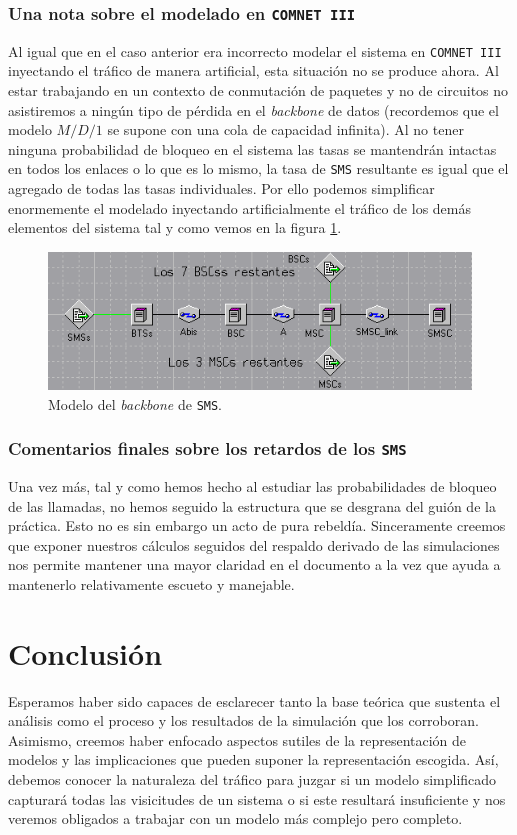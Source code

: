 \documentclass[10pt]{article}
\begin{document}
			\subsubsection{Una nota sobre el modelado en \texttt{COMNET III}}
				Al igual que en el caso anterior era incorrecto modelar el sistema en \texttt{COMNET III} inyectando el tráfico de manera artificial, esta situación no se produce ahora. Al estar trabajando en un contexto de conmutación de paquetes y no de circuitos no asistiremos a ningún tipo de pérdida en el \textit{backbone} de datos (recordemos que el modelo $M/D/1$ se supone con una cola de capacidad infinita). Al no tener ninguna probabilidad de bloqueo en el sistema las tasas se mantendrán intactas en todos los enlaces o lo que es lo mismo, la tasa de \texttt{SMS} resultante es igual que el agregado de todas las tasas individuales. Por ello podemos simplificar enormemente el modelado inyectando artificialmente el tráfico de los demás elementos del sistema tal y como vemos en la figura \ref{f:sms_system}.

				\begin{figure}
					\centering
					\includegraphics[width=0.5\linewidth]{sms_system.png}
					\caption{Modelo del \textit{backbone} de \texttt{SMS}.}
					\label{f:sms_system}
				\end{figure}

			\subsubsection{Comentarios finales sobre los retardos de los \texttt{SMS}}
				Una vez más, tal y como hemos hecho al estudiar las probabilidades de bloqueo de las llamadas, no hemos seguido la estructura que se desgrana del guión de la práctica. Esto no es sin embargo un acto de pura rebeldía. Sinceramente creemos que exponer nuestros cálculos seguidos del respaldo derivado de las simulaciones nos permite mantener una mayor claridad en el documento a la vez que ayuda a mantenerlo relativamente escueto y manejable.

	\section{Conclusión}
		Esperamos haber sido capaces de esclarecer tanto la base teórica que sustenta el análisis como el proceso y los resultados de la simulación que los corroboran.
		Asimismo, creemos haber enfocado aspectos sutiles de la representación de modelos y las implicaciones que pueden suponer la representación escogida. Así, debemos conocer la naturaleza del tráfico para juzgar si un modelo simplificado capturará todas las visicitudes de un sistema o si este resultará insuficiente y nos veremos obligados a trabajar con un modelo más complejo pero completo.
\end{document}
